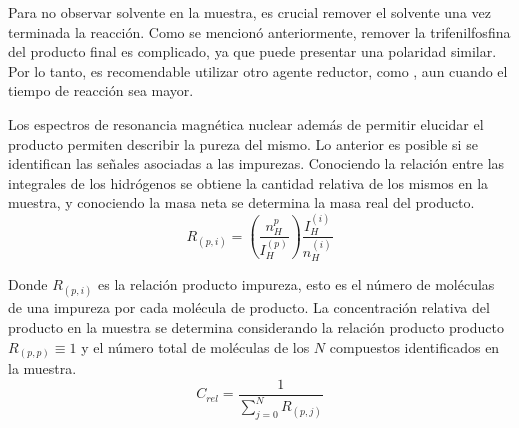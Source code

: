 \documentclass[fleqn,10pt]{SelfArx}
\begin{document}
Para no observar solvente en la muestra, es crucial remover el solvente una vez terminada la reacción. Como se mencionó anteriormente, remover la trifenilfosfina del producto final es complicado, ya que puede presentar una polaridad similar. Por lo tanto, es recomendable utilizar otro agente reductor, como , aun cuando el tiempo de reacción sea mayor.

Los espectros de resonancia magn\'etica nuclear adem\'as de permitir elucidar el producto permiten describir la pureza del mismo. Lo anterior es posible si se identifican las se\~nales asociadas a las impurezas. Conociendo la relaci\'on entre las integrales de los hidr\'ogenos se obtiene la cantidad relativa de los mismos en la muestra, y conociendo la masa neta se determina la masa real del producto.
\begin{equation}
R_{(p, i)} = \left(\dfrac{n_H^{p}}{I_H^{(p)}}\right)\dfrac{I^{(i)}_H}{n_H^{(i)}}
\end{equation}
\pagebreak

Donde $R_{(p, i)}$ es la relaci\'on producto impureza, esto es el n\'umero de mol\'eculas de una impureza por cada mol\'ecula de producto. La concentraci\'on relativa del producto en la muestra se determina considerando la relaci\'on producto producto $R_{(p, p)} \equiv 1$ y el n\'umero total de mol\'eculas de los $N$ compuestos identificados en la muestra.
\begin{equation}\label{eq: concentracion}
C_{rel} = \dfrac{1}{\sum\limits_{j = 0}^{N} R_{(p, j)}}
\end{equation}
\end{document}
